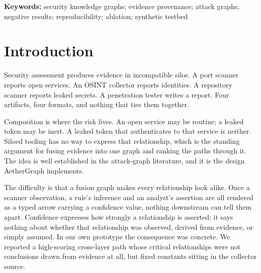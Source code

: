 \documentclass[11pt,a4paper]{article}
\begin{document}
\begin{abstract}
A fresh live end-to-end execution against the running testbed reproduces this result: 9 observed, 3 derived and 1 declared relationship, no capability relationship, and no attack path. The evaluation remains confined to a controlled testbed containing no capability relationship of its own, so the zero-path outcome reflects that environment and supports no claim about others. A separate live positive control, run against a real Gitea instance with a verified access token and a working repository remote, confirms that the same rule emits a derived capability relationship when the required evidence is present, and that attack traversal then returns a non-empty path (score $0.855$). That is one controlled case, not a measure of accuracy or generality. The contribution is the documented failure mode and its remedy: confidence and provenance are orthogonal properties of a relationship, and a confidence value alone cannot distinguish an observation from an assumption.
\end{abstract}

\textbf{Keywords:} security knowledge graphs; evidence provenance; attack graphs; negative results; reproducibility; ablation; synthetic testbed

\section{Introduction}
Security assessment produces evidence in incompatible silos. A port scanner reports open services. An OSINT collector reports identities. A repository scanner reports leaked secrets. A penetration tester writes a report. Four artifacts, four formats, and nothing that ties them together.

Composition is where the risk lives. An open service may be routine; a leaked token may be inert. A leaked token that authenticates to that service is neither. Siloed tooling has no way to express that relationship, which is the standing argument for fusing evidence into one graph and ranking the paths through it. The idea is well established in the attack-graph literature, and it is the design AetherGraph implements.

The difficulty is that a fusion graph makes every relationship look alike. Once a scanner observation, a rule's inference and an analyst's assertion are all rendered as a typed arrow carrying a confidence value, nothing downstream can tell them apart. Confidence expresses how strongly a relationship is asserted; it says nothing about whether that relationship was observed, derived from evidence, or simply assumed. In our own prototype the consequence was concrete. We reported a high-scoring cross-layer path whose critical relationships were not conclusions drawn from evidence at all, but fixed constants sitting in the collector source.
\end{document}
